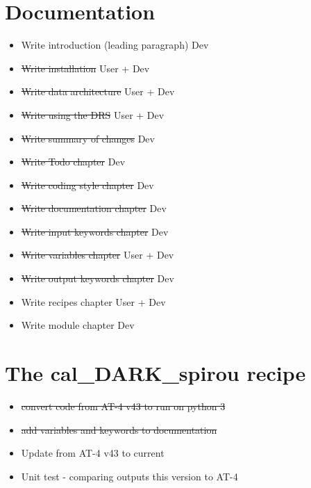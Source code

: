 \section{Documentation}
\label{ch:todo:documentation}

\begin{itemize}
	\item Write introduction (leading paragraph) \dotfill Dev
	\item \sout{Write installation} \dotfill User + Dev
	\item \sout{Write data architecture} \dotfill User + Dev
	\item \sout{Write using the DRS} \dotfill User + Dev
	\item \sout{Write summary of changes} \dotfill Dev
	\item \sout{Write Todo chapter} \dotfill Dev
	\item \sout{Write coding style chapter} \dotfill Dev
	\item \sout{Write documentation chapter} \dotfill Dev
	\item \sout{Write input keywords chapter} \dotfill Dev
	\item \sout{Write variables chapter} \dotfill User + Dev
	\item \sout{Write output keywords chapter} \dotfill Dev
	\item Write recipes chapter \dotfill User + Dev
	\item Write module chapter \dotfill Dev
\end{itemize}


\section{The cal\_DARK\_spirou recipe}
\label{ch:todo:cal_DARK_spirou}

\begin{itemize}
	\item \sout{convert code from AT-4 v43 to run on python 3}
	\item \sout{add variables and keywords to documentation}
	\item Update from AT-4 v43 to current
	\item Unit test - comparing outputs this version to AT-4
\end{itemize}

